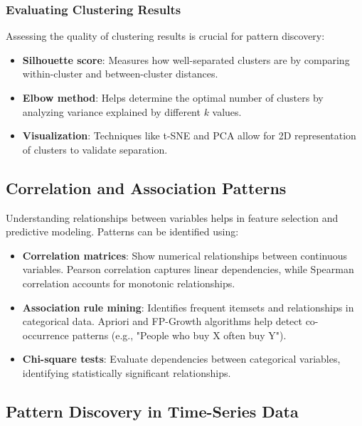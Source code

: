 \documentclass[12pt,openany, draft]{book}
\begin{document}
\subsubsection{Evaluating Clustering Results}

Assessing the quality of clustering results is crucial for pattern discovery:
\begin{itemize}
    \item \textbf{Silhouette score}: Measures how well-separated clusters are by comparing within-cluster and between-cluster distances.
    \item \textbf{Elbow method}: Helps determine the optimal number of clusters by analyzing variance explained by different \( k \) values.
    \item \textbf{Visualization}: Techniques like t-SNE and PCA allow for 2D representation of clusters to validate separation.
\end{itemize}

\subsection{Correlation and Association Patterns}

Understanding relationships between variables helps in feature selection and predictive modeling. Patterns can be identified using:
\begin{itemize}
    \item \textbf{Correlation matrices}: Show numerical relationships between continuous variables. Pearson correlation captures linear dependencies, while Spearman correlation accounts for monotonic relationships.
    \item \textbf{Association rule mining}: Identifies frequent itemsets and relationships in categorical data. Apriori and FP-Growth algorithms help detect co-occurrence patterns (e.g., "People who buy X often buy Y").
    \item \textbf{Chi-square tests}: Evaluate dependencies between categorical variables, identifying statistically significant relationships.
\end{itemize}

\subsection{Pattern Discovery in Time-Series Data}
\end{document}
